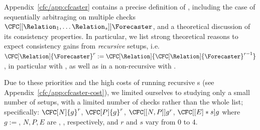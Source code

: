 
Appendix~\ref{cfc/app:cfcaster} contains a precise definition of \CFCaster{}, including the case of sequentially arbitraging on multiple checks $\CFC[[\Relation_1,\dots\Relation_s]]{\Forecaster}$, and a theoretical discussion of its consistency properties. In particular, we list strong theoretical reasons to expect consistency gains from \emph{recursive} \CFCaster{} setups, i.e. $\CFC[\Relation]{\Forecaster}^r:=\CFC[\Relation]{\CFC[\Relation]{\Forecaster}^{r-1}}$, in particular with \NegChecker{}, as well as in a non-recursive \CFCaster{} with \ExpectedEvidenceChecker{}.

Due to these priorities and the high costs of running recursive \CFCaster{}s (see Appendix~\ref{cfc/app:cfcaster-cost}), we limited ourselves to studying only a small number of \CFCaster{} setups, with a limited number of checks rather than the whole list; specifically: $\CFC[N]{g}^r$, $\CFC[P]{g}^r$, $\CFC[[N,P]]{g}^r$, $\CFC[[E]*s]{g}$ where $g:=$\gptfouromini{}, $N,P,E$ are \NegChecker{}, \ParaphraseChecker{}, \ExpectedEvidenceChecker{} respectively, and $r$ and $s$ vary from 0 to 4.


